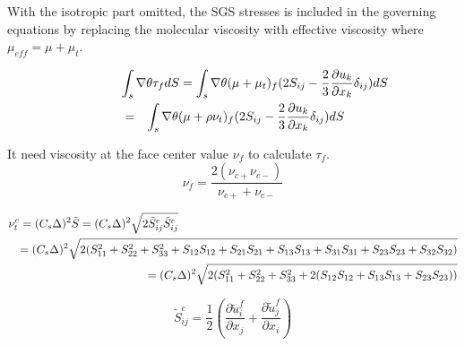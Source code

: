 \documentclass[12pt,titlepage]{article}
\begin{document}
With the isotropic part omitted, the SGS stresses is included in the governing equations 
by replacing the molecular viscosity with
effective viscosity where $\mu_{eff} = \mu + \mu_{t}$.

\begin{eqnarray}
\lefteqn{\int_s \nabla \theta \tau_f dS = \int_s \nabla \theta (\mu + \mu_{t})_f
(2 S_{ij}-\frac{2}{3}\frac{\partial{u_k}}{\partial{x_k}}\delta_{ij})dS\nonumber}\\
& = & \int_s \nabla \theta (\mu + \rho\nu_{t})_f(2 S_{ij}-\frac{2}{3}\frac{\partial{u_k}}
 {\partial{x_k}}\delta_{ij})dS\nonumber
\end{eqnarray}

It need viscosity at the face center value $\nu_f$ to calculate $\tau_f$. 
\begin{displaymath}
\nu_f=\frac{2(\nu_{c+}\nu_{c-})}{\nu_{c+}+\nu_{c-}}
\end{displaymath}

\begin{eqnarray}
\lefteqn{\nu_t^c = (C_s \Delta)^2\tilde{S}= (C_s \Delta)^2\sqrt{2 \tilde{S}_{ij}^c \tilde{S}_{ij}^c}\nonumber}\\
& & =(C_s\Delta)^2\sqrt{2(S_{11}^2+S_{22}^2+S_{33}^2+S_{12}S_{12}+S_{21}S_{21}+S_{13}S_{13}
     +S_{31}S_{31}+S_{23}S_{23}+S_{32}S_{32})}\nonumber\\
& & =(C_s\Delta)^2\sqrt{2(S_{11}^2+S_{22}^2+S_{33}^2+2(S_{12}S_{12}+S_{13}S_{13}+S_{23}S_{23}))}
\end{eqnarray}

\begin{displaymath}
\tilde{S}_{ij}^c=\frac{1}{2} (\frac{\partial \tilde{u}_i^f}{\partial x_j}
               +\frac{\partial \tilde{u}_j^f}{\partial x_i})
\end{displaymath}
\end{document}

